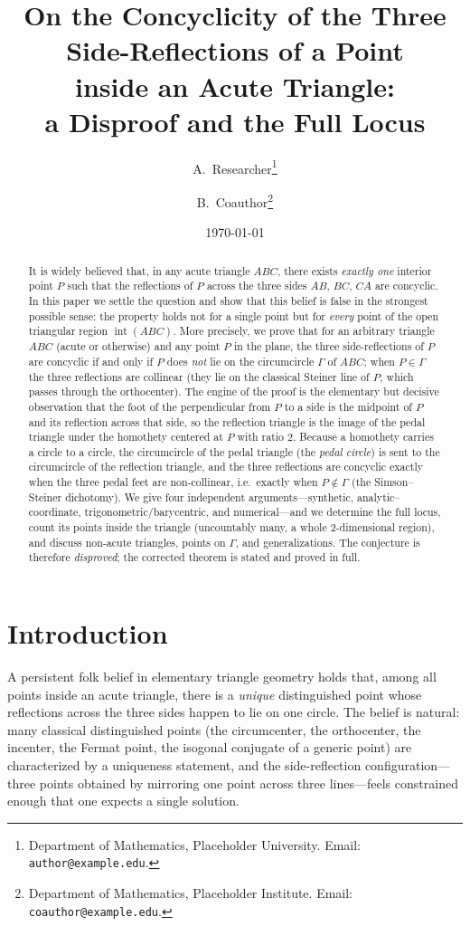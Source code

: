 \documentclass[11pt,a4paper]{article}
\title{\textbf{On the Concyclicity of the Three Side-Reflections of a Point\\
inside an Acute Triangle:\\ a Disproof and the Full Locus}}
\author{A.~Researcher\thanks{Department of Mathematics, Placeholder University. Email: \texttt{author@example.edu}.}\\
\and B.~Coauthor\thanks{Department of Mathematics, Placeholder Institute. Email: \texttt{coauthor@example.edu}.}}
\date{\today}
\theoremstyle{definition}
\newcommand{\circc}{\Gamma}
\begin{document}
\maketitle

\begin{abstract}
\noindent It is widely believed that, in any acute triangle $ABC$, there exists \emph{exactly one} interior point $P$ such that the reflections of $P$ across the three sides $AB$, $BC$, $CA$ are concyclic. In this paper we settle the question and show that this belief is false in the strongest possible sense: the property holds not for a single point but for \emph{every} point of the open triangular region $\operatorname{int}(ABC)$. More precisely, we prove that for an arbitrary triangle $ABC$ (acute or otherwise) and any point $P$ in the plane, the three side-reflections of $P$ are concyclic if and only if $P$ does \emph{not} lie on the circumcircle $\circc$ of $ABC$; when $P\in\circc$ the three reflections are collinear (they lie on the classical Steiner line of $P$, which passes through the orthocenter). The engine of the proof is the elementary but decisive observation that the foot of the perpendicular from $P$ to a side is the midpoint of $P$ and its reflection across that side, so the reflection triangle is the image of the pedal triangle under the homothety centered at $P$ with ratio $2$. Because a homothety carries a circle to a circle, the circumcircle of the pedal triangle (the \emph{pedal circle}) is sent to the circumcircle of the reflection triangle, and the three reflections are concyclic exactly when the three pedal feet are non-collinear, i.e.\ exactly when $P\notin\circc$ (the Simson--Steiner dichotomy). We give four independent arguments---synthetic, analytic--coordinate, trigonometric/barycentric, and numerical---and we determine the full locus, count its points inside the triangle (uncountably many, a whole $2$-dimensional region), and discuss non-acute triangles, points on $\circc$, and generalizations. The conjecture is therefore \emph{disproved}; the corrected theorem is stated and proved in full.
\end{abstract}

\tableofcontents

\section{Introduction}

A persistent folk belief in elementary triangle geometry holds that, among all points inside an acute triangle, there is a \emph{unique} distinguished point whose reflections across the three sides happen to lie on one circle. The belief is natural: many classical distinguished points (the circumcenter, the orthocenter, the incenter, the Fermat point, the isogonal conjugate of a generic point) are characterized by a uniqueness statement, and the side-reflection configuration---three points obtained by mirroring one point across three lines---feels constrained enough that one expects a single solution.
\end{document}
